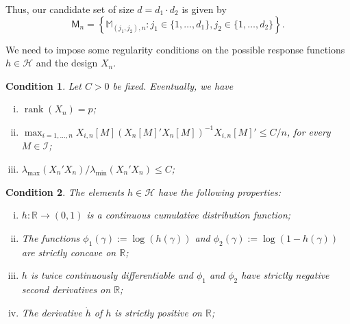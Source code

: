 \documentclass[preprint]{imsart}
\newcommand{\R}{{\mathbb R}}
\newcommand{\lmax}{\lambda_{\max}}
\newcommand{\lmin}{\lambda_{\min}}
\DeclareMathOperator{\rank}{rank}
\newtheorem{cond}{Condition}
\numberwithin{equation}{section}
\begin{document}
%
Thus, our candidate set of size $d = d_1 \cdot d_2$ is given by
\begin{equation*}
\mathsf{M}_n = \left\{\mathbb{M}_{(j_1,j_2),n}: j_1 \in\{1, \hdots, d_1\}, j_2 \in \{1,\dots, d_2\} \right\}.
\end{equation*}

We need to impose some regularity conditions on the possible response functions $h\in\mathcal H$ and the design $X_n$.

\renewcommand{\thecond}{X2}
\begin{cond}\label{cond:X2} 
Let $C>0$ be fixed. Eventually, we have
\begin{enumerate}[(i)]
\item\label{cX2:rank} $\rank(X_n) = p$;
\item\label{cX2:Huber} $\max_{i = 1, \hdots, n} X_{i,n}[M] \left( X_{n}[M]'X_{n}[M]  \right)^{-1} X_{i,n}[M]' \le C/n$, for every $M \in \mathcal{I}$;
\item\label{cX2:eigen} $\lmax(X_n'X_n)/\lmin(X_n'X_n) \le C$;
\end{enumerate}
\end{cond}

\renewcommand{\thecond}{H}
\begin{cond}\label{cond:H} 
The elements $h\in\mathcal H$ have the following properties:
\begin{enumerate}[(i)]
\item\label{cH:cdf} $h:\R\to(0,1)$ is a continuous cumulative distribution function;
\item\label{cH:concave} The functions $\phi_1(\gamma) := \log(h(\gamma))$ and $\phi_2(\gamma) := \log(1-h(\gamma))$ are strictly concave on $\R$;
\item\label{cH:C2} $h$ is twice continuously differentiable and $\phi_1$ and $\phi_2$ have strictly negative second derivatives on $\R$;
\item\label{cH:Hdot} The derivative $\dot{h}$ of $h$ is strictly positive on $\R$;
\end{enumerate}
\end{cond}
\end{document}
